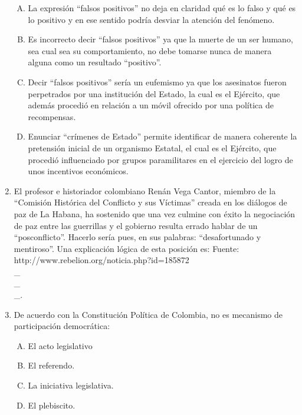 \begin{enumerate}
\begin{enumerate}[(A)]
\item    La expresión ``falsos positivos'' no deja en claridad qué es lo falso y qué es lo positivo y en ese sentido podría desviar la atención del fenómeno.
 \item  Es incorrecto decir ``falsos positivos'' ya que la muerte de un ser humano, sea cual sea su comportamiento, no debe tomarse nunca de manera alguna como un resultado ``positivo''.
\item Decir ``falsos positivos'' sería un eufemismo ya que los asesinatos fueron perpetrados por una institución del Estado, la cual es el Ejército, que además procedió en relación a un móvil ofrecido por una política de recompensas. 
\item Enunciar ``crímenes de Estado'' permite identificar de manera coherente la pretensión inicial de un organismo Estatal, el cual es el Ejército, que procedió influenciado por grupos paramilitares en el ejercicio del logro de unos incentivos económicos.
\end{enumerate}



\item  El profesor e historiador colombiano Renán Vega Cantor, miembro de la ``Comisión Histórica del Conflicto y sus Víctimas'' creada en los diálogos de paz de La Habana, ha sostenido que una vez culmine con éxito la negociación de paz entre las guerrillas y el gobierno resulta errado hablar de un ``posconflicto''. Hacerlo sería pues, en sus palabras: ``desafortunado y mentiroso''. Una explicación lógica de esta posición es:\label{sociii-18} {\footnotesize Fuente: http://www.rebelion.org/noticia.php?id=185872}\hrulefill\\
\_\hrulefill\\
\_\hrulefill\\
\_\hrulefill.



\item  De acuerdo con la Constitución Política de Colombia, no es mecanismo de participación democrática:\label{sociii-19}


\begin{enumerate}[(A)]
\item   El acto legislativo
 \item  El referendo.
\item La iniciativa legislativa.
\item El plebiscito.
\end{enumerate}



\end{enumerate}
